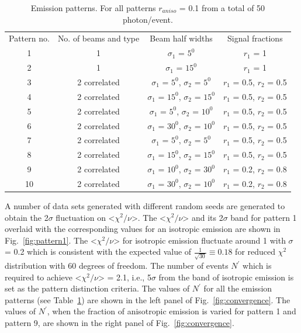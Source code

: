 \begin{table}[h]
  \centering
  \caption{Emission patterns. For all patterns $r_{aniso}$ = 0.1 from a 
  total of 50 photon/event.}
  \label{tab:AnisoPattern}
  \begin{tabular}{|c | c| c | c|}
  \hline
  Pattern no. & No. of beams and type & Beam half widths & Signal fractions \\
  1 & 1 & $\sigma_1$ = $5^{0}$ & $r_1$ = 1 \\
   2 & 1 & $\sigma_1$ = $15^{0}$ & $r_1$ = 1 \\
   3 & 2 correlated & $\sigma_1$ = $5^{0}$, $\sigma_2$ = $5^{0}$ & $r_1$ = 0.5, $r_2$ = 0.5  \\
   4 & 2 correlated & $\sigma_1$ = $15^{0}$, $\sigma_2$ = $15^{0}$ & $r_1$ = 0.5, $r_2$ = 0.5 \\
   5 & 2 correlated & $\sigma_1$ = $5^{0}$, $\sigma_2$ = $10^{0}$ & $r_1$ = 0.5, $r_2$ = 0.5 \\
   6 & 2 correlated & $\sigma_1$ = $30^{0}$, $\sigma_2$ = $10^{0}$ & $r_1$ = 0.5, $r_2$ = 0.5 \\
   7 & 2 correlated & $\sigma_1$ = $5^{0}$, $\sigma_2$ = $5^{0}$ & $r_1$ = 0.5, $r_2$ = 0.5 \\
   8 & 2 correlated & $\sigma_1$ = $15^{0}$, $\sigma_2$ = $15^{0}$ & $r_1$ = 0.5, $r_2$ = 0.5 \\
   9 & 2 correlated & $\sigma_1$ = $10^{0}$, $\sigma_2$ = $30^{0}$ & $r_1$ = 0.2, $r_2$ = 0.8 \\
    10 & 2 correlated & $\sigma_1$ = $30^{0}$, $\sigma_2$ = $10^{0}$ & $r_1$ = 0.2, $r_2$ = 0.8 \\
  \hline
 \end{tabular}
\end{table}

A number of data sets generated with different random seeds are 
generated to obtain the 2$\sigma$ fluctuation on <$\chi^2/\nu$>. The <$\chi^2/\nu$> 
and its 2$\sigma$ band for pattern 1 overlaid with the corresponding values 
for an isotropic emission are shown in Fig.~\ref{fig:pattern1}. The <$\chi^2/\nu$> for 
isotropic emission fluctuate around 1 with $\sigma$ = 0.2 which is consistent with 
the expected value of $\frac{1}{\sqrt{30}} \equiv 0.18$ for reduced $\chi^2$ distribution 
with 60 degrees of freedom. The number of events 
$N^{'}$ which is required to achieve <$\chi^2/\nu$> = 2.1, i.e., 5$\sigma$ from the 
band of isotropic emission is set as the pattern distinction criteria. The values of 
$N^{'}$ for all the emission patterns (see Table~\ref{tab:AnisoPattern}) are shown 
in the left panel of Fig.~\ref{fig:convergence}. The values of $N^{'}$, when the fraction of anisotropic 
emission is varied for pattern 1 and pattern 9, are shown in the right panel of Fig.~\ref{fig:convergence}. 

